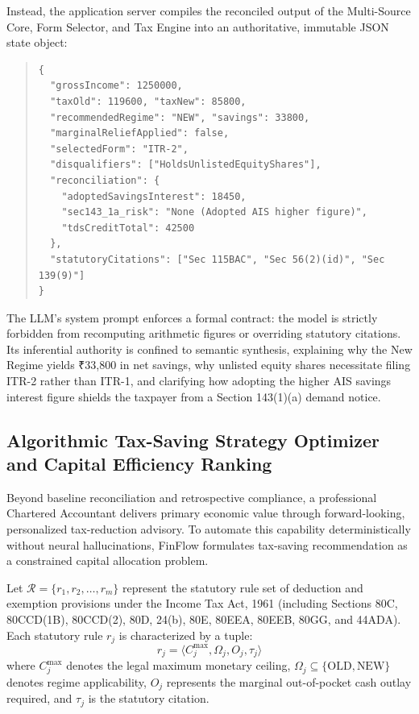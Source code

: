\documentclass[conference]{IEEEtran}
\begin{document}
Instead, the application server compiles the reconciled output of the Multi-Source Core, Form Selector, and Tax Engine into an authoritative, immutable JSON state object:
\begin{quote}
\small
\begin{verbatim}
{
  "grossIncome": 1250000,
  "taxOld": 119600, "taxNew": 85800,
  "recommendedRegime": "NEW", "savings": 33800,
  "marginalReliefApplied": false,
  "selectedForm": "ITR-2",
  "disqualifiers": ["HoldsUnlistedEquityShares"],
  "reconciliation": {
    "adoptedSavingsInterest": 18450,
    "sec143_1a_risk": "None (Adopted AIS higher figure)",
    "tdsCreditTotal": 42500
  },
  "statutoryCitations": ["Sec 115BAC", "Sec 56(2)(id)", "Sec 139(9)"]
}
\end{verbatim}
\end{quote}
The LLM's system prompt enforces a formal contract: the model is strictly forbidden from recomputing arithmetic figures or overriding statutory citations. Its inferential authority is confined to semantic synthesis, explaining why the New Regime yields ₹33,800 in net savings, why unlisted equity shares necessitate filing ITR-2 rather than ITR-1, and clarifying how adopting the higher AIS savings interest figure shields the taxpayer from a Section 143(1)(a) demand notice.

\subsection{Algorithmic Tax-Saving Strategy Optimizer and Capital Efficiency Ranking}
\label{sec:tax_optimizer}
Beyond baseline reconciliation and retrospective compliance, a professional Chartered Accountant delivers primary economic value through forward-looking, personalized tax-reduction advisory. To automate this capability deterministically without neural hallucinations, FinFlow formulates tax-saving recommendation as a constrained capital allocation problem.

Let $\mathcal{R} = \{r_1, r_2, \dots, r_m\}$ represent the statutory rule set of deduction and exemption provisions under the Income Tax Act, 1961 (including Sections 80C, 80CCD(1B), 80CCD(2), 80D, 24(b), 80E, 80EEA, 80EEB, 80GG, and 44ADA). Each statutory rule $r_j$ is characterized by a tuple:
\begin{equation}
r_j = \langle C_j^{\max}, \Omega_j, O_j, \tau_j \rangle
\end{equation}
where $C_j^{\max}$ denotes the legal maximum monetary ceiling, $\Omega_j \subseteq \{\text{OLD}, \text{NEW}\}$ denotes regime applicability, $O_j$ represents the marginal out-of-pocket cash outlay required, and $\tau_j$ is the statutory citation.
\end{document}
